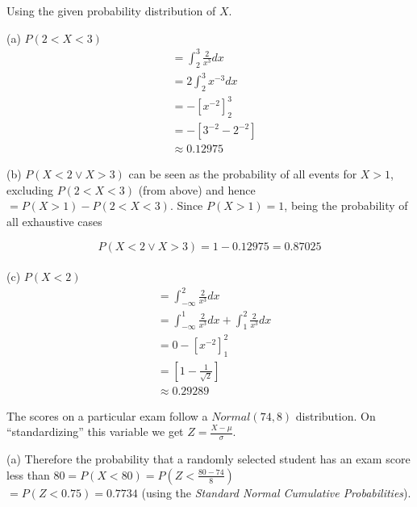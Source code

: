 \documentclass[boxes, qed]{homework}
\begin{document}
\newenvironment{amatrix}[1]{%
  \left[\begin{array}{@{}*{#1}{c}|c@{}}
}{%
  \end{array}\right]
}

\newenvironment{augmatrix}[1]{%
  \left[\begin{array}{#1}
}{%
  \end{array}\right]
}

\begin{problem}Using the given probability distribution of $X$.
\end{problem}
\begin{solution}
  (a) $P(2 < X < 3)$
    \begin{align*}
      &= \int_{2}^{3}{\frac{2}{x^3}}dx\\
      &= 2\int_{2}^{3}{x^{-3}}dx\\
      &= -\left[ x^{-2} \right]_{2}^{3}\\
      &= -\left[ 3^{-2} - 2^{-2} \right]\\
      &\approx \boxed{0.12975}
    \end{align*}
    
    (b) $P(X < 2 \lor X > 3)$ can be seen as the probability
    of all events for $X>1$, excluding $P(2 < X < 3)$ (from above)
    and hence $= P(X > 1) - P(2 < X < 3)$.
    Since $P(X > 1)=1$, being the probability of all exhaustive cases

    $$P(X < 2 \lor X > 3) = 1-0.12975 = \boxed{0.87025}$$\\

    (c) $P(X < 2)$
    \begin{align*}
      &= \int_{-\infty}^{2}{\frac{2}{x^3}}dx\\
      &= \int_{-\infty}^{1}{\frac{2}{x^3}}dx + \int_{1}^{2}{\frac{2}{x^3}}dx\\
      &= 0 -\left[ x^{-2} \right]_{1}^{2}\\
      &= \left[ 1-\frac{1}{\sqrt{2}} \right]\\
      &\approx \boxed{0.29289}
    \end{align*}
\end{solution}

\begin{problem}The scores on a particular exam follow a $Normal(74, 8)$ distribution.
  On ``standardizing'' this variable we get
  $Z=\frac{X-\mu}{\sigma}$.
\end{problem}
\begin{solution}(a) Therefore the probability that a randomly selected student 
  has an exam score less than $80 = P(X<80) = P(Z<\frac{80-74}{8})$\\
  $=P(Z<0.75) = \boxed{0.7734}$ (using the \textit{Standard Normal Cumulative Probabilities}).
\end{solution}
\end{document}
